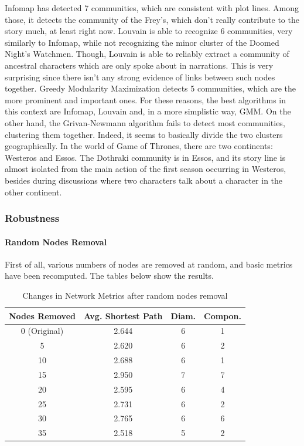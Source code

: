 \documentclass[10pt,twocolumn,letterpaper]{article}
\begin{document}
Infomap has detected 7 communities, which are consistent with plot lines. Among those, it detects the community of the Frey's, which don't really contribute to the story much, at least right now. Louvain is able to recognize 6 communities, very similarly to Infomap, while not recognizing the minor cluster of the Doomed Night's Watchmen. Though, Louvain is able to reliably extract a community of ancestral characters which are only spoke about in narrations. This is very surprising since there isn't any strong evidence of links between such nodes together. Greedy Modularity Maximization detects 5 communities, which are the more prominent and important ones. 
For these reasons, the best algorithms in this context are Infomap, Louvain and, in a more simplistic way, GMM. 
On the other hand, the Grivan-Newmann algorithm fails to detect most communities, clustering them together. Indeed, it seems to basically divide the two clusters geographically. In the world of Game of Thrones, there are two continents: Westeros and Essos. The Dothraki community is in Essos, and its story line is almost isolated from the main action of the first season occurring in Westeros, besides during discussions where two characters talk about a character in the other continent.


\subsubsection{Robustness}

\paragraph{Random Nodes Removal}

First of all, various numbers of nodes are removed at random, and basic metrics have been recomputed. The tables below show the results.

\begin{table}[!h]
    \centering
    \small
    \begin{tabular}{c|c|c|c} 
        Nodes Removed & Avg. Shortest Path & Diam. & Compon. \\
        \hline
        0 (Original) & 2.644 & 6 & 1 \\
        5	& 2.620	& 6	& 2 \\
        10	& 2.688	& 6	& 1 \\
        15	& 2.950	& 7	& 7 \\
        20	& 2.595	& 6	& 4 \\
        25	& 2.731	& 6	& 2 \\
        30	& 2.765	& 6	& 6 \\
        35	& 2.518	& 5	& 2 \\
        \hline 
    \end{tabular} \\
    \caption{Changes in Network Metrics after random nodes removal}
    \label{tab:my_label}
\end{table} \\
\end{document}
